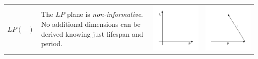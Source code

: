 \documentclass[
  12pt
]{scrartcl}
\begin{document}
\begin{center}
\begin{longtable}{m{}m{}m{}m{}}
  \midrule
  $LP(-)$ &
  The $LP$ plane is \emph{non-informative}. No additional dimensions can be derived knowing just lifespan and period. &
  \includegraphics[width = \linewidth]{../fig/LP.pdf} &
  \includegraphics[width = \linewidth]{../fig/LP_iso.pdf}  \\

\end{longtable}
\end{center}
\end{document}
